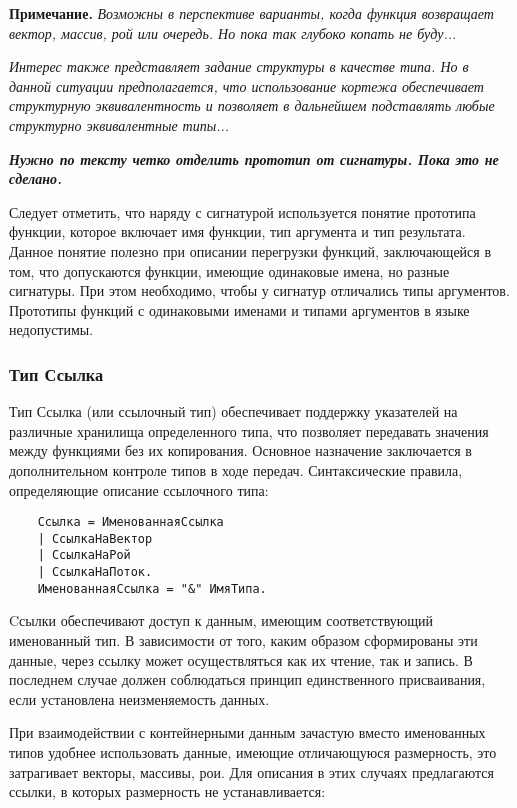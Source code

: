 {\textbf{Примечание.}
\textit{Возможны в перспективе варианты, когда функция возвращает вектор, массив, рой или очередь. Но пока так глубоко копать не буду...}

\textit{Интерес также представляет задание структуры в качестве типа. Но в данной ситуации предполагается, что использование кортежа обеспечивает структурную эквивалентность и позволяет в дальнейшем подставлять любые структурно эквивалентные типы...}

\textbf{\textit{Нужно по тексту четко отделить прототип от сигнатуры. Пока это не сделано.}}

Следует отметить, что наряду с сигнатурой используется понятие прототипа функции, которое включает имя функции, тип аргумента и тип результата. Данное понятие полезно при описании перегрузки функций, заключающейся в том, что допускаются функции, имеющие одинаковые имена, но разные сигнатуры. При этом необходимо, чтобы у сигнатур отличались типы аргументов. Прототипы функций с одинаковыми именами и типами аргументов в языке недопустимы.

\subsubsection{Тип Ссылка}

Тип Ссылка (или ссылочный тип) обеспечивает поддержку указателей на различные хранилища определенного типа, что позволяет передавать значения между функциями без их копирования. Основное назначение заключается в дополнительном контроле типов в ходе передач. Синтаксические правила, определяющие описание ссылочного типа:

\begin{verbatim}
    Ссылка = ИменованнаяСсылка
    | СсылкаНаВектор
    | СсылкаНаРой
    | СсылкаНаПоток.
    ИменованнаяСсылка = "&" ИмяТипа.
\end{verbatim}

Cсылки обеспечивают доступ к данным, имеющим соответствующий именованный тип. В зависимости от того, каким образом сформированы эти данные, через ссылку может осуществляться как их чтение, так и запись. В последнем случае должен соблюдаться принцип единственного присваивания, если установлена неизменяемость данных.

При взаимодействии с контейнерными данным зачастую вместо именованных типов удобнее использовать данные, имеющие отличающуюся размерность, это затрагивает векторы, массивы, рои. Для описания в этих случаях предлагаются ссылки, в которых размерность не устанавливается:

}
